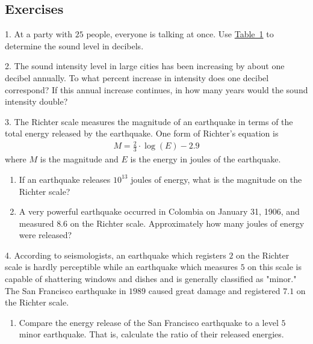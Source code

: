 \documentclass[10pt,]{book}
\theoremstyle{plain}
\theoremstyle{definition}
\theoremstyle{definition}
\theoremstyle{definition}
\numberwithin{equation}{section}
\begin{document}
\subsection[{Exercises}]{Exercises}\label{exercises-13}
\begin{exerciselist}
\item[1.]\hypertarget{exercise-83}{}\hypertarget{p-313}{}%
At a party with \(25\) people, everyone is talking at once.  Use \hyperref[decibel-table]{Table~1} to determine  the sound level in decibels.%
\par\smallskip
\item[2.]\hypertarget{exercise-84}{}\hypertarget{p-314}{}%
The sound intensity level in large cities has been increasing by about one decibel annually.  To what percent increase in intensity does one decibel correspond?  If this annual increase continues, in how many years would the sound intensity double?%
\par\smallskip
\item[3.]\hypertarget{exercise-85}{}\hypertarget{p-315}{}%
The Richter scale measures the magnitude of an earthquake in terms of the total energy released by the earthquake.  One form of Richter's equation is%
\begin{gather*}
M = \frac{2}{3} \cdot \log(E) - 2.9
\end{gather*}
where \(M\) is the magnitude and \(E\) is the energy in joules of the earthquake. \leavevmode%
\begin{enumerate}[label=(\alph*)]
\item\hypertarget{li-226}{}If an earthquake releases \(10^{13}\) joules of energy, what is the magnitude on the Richter scale?%
\item\hypertarget{li-227}{}A very powerful earthquake occurred in Colombia on January 31, 1906, and measured \(8.6\) on the Richter scale.  Approximately how many joules of energy were released?%
\end{enumerate}
%
\par\smallskip
\item[4.]\hypertarget{exercise-86}{}\hypertarget{p-316}{}%
According to seismologists, an earthquake which registers \(2\) on the Richter scale is hardly perceptible while an earthquake which measures \(5\) on this scale is capable of shattering windows and dishes and is generally classified as "minor."  The San Francisco earthquake in \(1989\) caused great damage and registered \(7.1\) on the Richter scale. \leavevmode%
\begin{enumerate}[label=(\alph*)]
\item\hypertarget{li-228}{}Compare the energy release of the San Francisco earthquake to a level \(5\) minor earthquake.  That is, calculate the ratio of their released energies.%

\end{enumerate}
\end{exerciselist}
\end{document}

